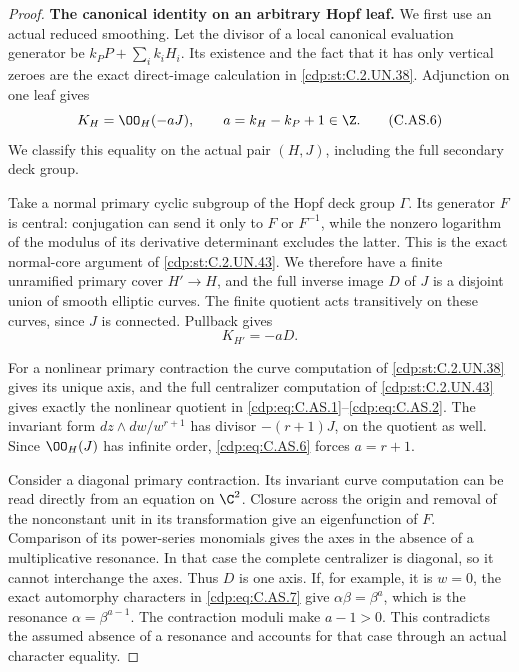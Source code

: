 \begin{proof}
\par\medskip\noindent\textbf{The canonical identity on an arbitrary Hopf leaf.}
We first use an actual reduced smoothing. Let the divisor
of a local canonical evaluation generator be
$k_PP+\sum_i k_iH_i$. Its existence and the fact that it
has only vertical zeroes are the exact direct-image
calculation in \ref{cdp:st:C.2.UN.38}. Adjunction on one leaf gives
\[
                  K_H=\OO_H(-aJ),\qquad
                  a=k_H-k_P+1\in\Z.                      \tag{C.AS.6}\label{cdp:eq:C.AS.6}
\]
We classify this equality on the actual pair $(H,J)$,
including the full secondary deck group.

Take a normal primary cyclic subgroup of the Hopf deck
group $\Gamma$. Its generator $F$ is central: conjugation
can send it only to $F$ or $F^{-1}$, while the nonzero
logarithm of the modulus of its derivative determinant
excludes the latter. This is the exact normal-core
argument of \ref{cdp:st:C.2.UN.43}. We therefore have a finite
unramified primary cover $H'\to H$, and the full inverse
image $D$ of $J$ is a disjoint union of smooth elliptic
curves. The finite quotient acts transitively on these
curves, since $J$ is connected. Pullback gives
\[
                           K_{H'}=-aD.                  \tag{C.AS.7}\label{cdp:eq:C.AS.7}
\]

For a nonlinear primary contraction the curve computation
of \ref{cdp:st:C.2.UN.38} gives its unique axis, and the full
centralizer computation of \ref{cdp:st:C.2.UN.43} gives exactly the
nonlinear quotient in \eqref{cdp:eq:C.AS.1}--\eqref{cdp:eq:C.AS.2}.
The invariant form $dz\wedge dw/w^{r+1}$ has divisor
$-(r+1)J$, on the quotient as well. Since $\OO_H(J)$ has
infinite order, \eqref{cdp:eq:C.AS.6} forces $a=r+1$.

Consider a diagonal primary contraction. Its invariant
curve computation can be read directly from an equation
on $\C^2$. Closure across the origin and removal of the
nonconstant unit in its transformation give an eigenfunction
of $F$. Comparison of its power-series monomials gives
the axes in the absence of a multiplicative resonance.
In that case the complete centralizer is diagonal, so
it cannot interchange the axes. Thus $D$ is one axis.
If, for example, it is $w=0$, the exact automorphy
characters in \eqref{cdp:eq:C.AS.7} give
$\alpha\beta=\beta^a$, which is the resonance
$\alpha=\beta^{a-1}$. The contraction moduli make
$a-1>0$. This contradicts the assumed absence of a
resonance and accounts for that case through an actual
character equality.


\end{proof}
